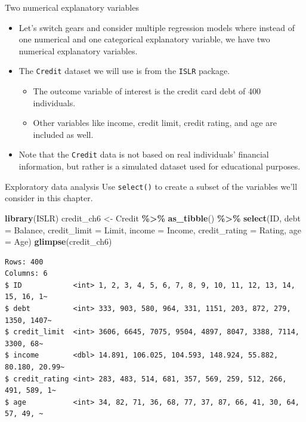 \documentclass[
  ignorenonframetext,
]{beamer}
\newenvironment{Shaded}{\begin{snugshade}}{\end{snugshade}}
\newcommand{\AttributeTok}[1]{\textcolor[rgb]{0.13,0.29,0.53}{#1}}
\newcommand{\FunctionTok}[1]{\textcolor[rgb]{0.13,0.29,0.53}{\textbf{#1}}}
\newcommand{\NormalTok}[1]{#1}
\newcommand{\OtherTok}[1]{\textcolor[rgb]{0.56,0.35,0.01}{#1}}
\newcommand{\SpecialCharTok}[1]{\textcolor[rgb]{0.81,0.36,0.00}{\textbf{#1}}}
\providecommand{\tightlist}{%
  \setlength{\itemsep}{0pt}\setlength{\parskip}{0pt}}
\begin{document}
\begin{frame}[fragile]{Two numerical explanatory variables}
\protect\hypertarget{two-numerical-explanatory-variables-1}{}
\begin{itemize}
\item
  Let's switch gears and consider multiple regression models where
  instead of one numerical and one categorical explanatory variable, we
  have two numerical explanatory variables.
\item
  The \texttt{Credit} dataset we will use is from the \texttt{ISLR}
  package.

  \begin{itemize}
  \tightlist
  \item
    The outcome variable of interest is the credit card debt of 400
    individuals.
  \item
    Other variables like income, credit limit, credit rating, and age
    are included as well.
  \end{itemize}
\item
  Note that the \texttt{Credit} data is not based on real individuals'
  financial information, but rather is a simulated dataset used for
  educational purposes.
\end{itemize}
\end{frame}

\begin{frame}[fragile]{Exploratory data analysis}
\protect\hypertarget{exploratory-data-analysis-14}{}
Use \texttt{select()} to create a subset of the variables we'll consider
in this chapter.

\small

\begin{Shaded}
\begin{Highlighting}[]
\FunctionTok{library}\NormalTok{(ISLR)}
\NormalTok{credit\_ch6 }\OtherTok{\textless{}{-}}\NormalTok{ Credit }\SpecialCharTok{\%\textgreater{}\%} 
  \FunctionTok{as\_tibble}\NormalTok{() }\SpecialCharTok{\%\textgreater{}\%} 
  \FunctionTok{select}\NormalTok{(ID, }\AttributeTok{debt =}\NormalTok{ Balance, }\AttributeTok{credit\_limit =}\NormalTok{ Limit, }
         \AttributeTok{income =}\NormalTok{ Income, }\AttributeTok{credit\_rating =}\NormalTok{ Rating, }\AttributeTok{age =}\NormalTok{ Age)}
\FunctionTok{glimpse}\NormalTok{(credit\_ch6)}
\end{Highlighting}
\end{Shaded}

\begin{verbatim}
Rows: 400
Columns: 6
$ ID            <int> 1, 2, 3, 4, 5, 6, 7, 8, 9, 10, 11, 12, 13, 14, 15, 16, 1~
$ debt          <int> 333, 903, 580, 964, 331, 1151, 203, 872, 279, 1350, 1407~
$ credit_limit  <int> 3606, 6645, 7075, 9504, 4897, 8047, 3388, 7114, 3300, 68~
$ income        <dbl> 14.891, 106.025, 104.593, 148.924, 55.882, 80.180, 20.99~
$ credit_rating <int> 283, 483, 514, 681, 357, 569, 259, 512, 266, 491, 589, 1~
$ age           <int> 34, 82, 71, 36, 68, 77, 37, 87, 66, 41, 30, 64, 57, 49, ~
\end{verbatim}

\normalsize
\end{frame}
\end{document}
